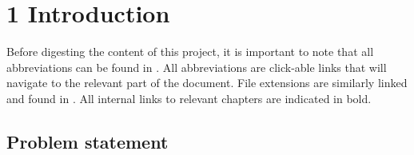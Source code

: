 

\chapter*{1 Introduction}
\label{intro}
\setcounter{chapter}{1}
\setcounter{section}{0}

Before digesting the content of this project, it is important to note that all abbreviations can be found in \textbf{}. All abbreviations are click-able links that will navigate to the relevant part of the document. File extensions are similarly linked and found in \textbf{}. All internal links to relevant chapters are indicated in bold.
\section{Problem statement}
\label{ps}

